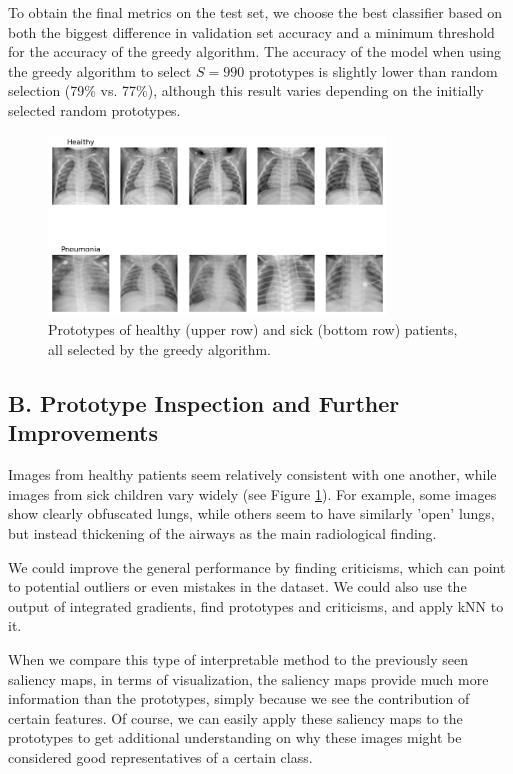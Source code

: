To obtain the final metrics on the test set, we choose the best classifier based on both the biggest difference in validation set accuracy and a minimum threshold for the accuracy of the greedy algorithm.
The accuracy of the model when using the greedy algorithm to select $S=990$ prototypes is slightly lower than random selection (79\% vs. 77\%), although this result varies depending on the initially selected random prototypes.

\begin{figure}
    \centering
    \includegraphics[width=0.8\textwidth]{images/prototypes.png}
    \caption{Prototypes of healthy (upper row) and sick (bottom row) patients, all selected by the greedy algorithm.}
    \label{fig:prototypes}
\end{figure}

\subsection*{B. Prototype Inspection and Further Improvements}

Images from healthy patients seem relatively consistent with one another, while images from sick children vary widely (see Figure \ref{fig:prototypes}). For example, some images show clearly obfuscated lungs, while others seem to have similarly 'open' lungs, but instead thickening of the airways as the main radiological finding.

We could improve the general performance by finding criticisms, which can point to potential outliers or even mistakes in the dataset.
We could also use the output of integrated gradients, find prototypes and criticisms, and apply kNN to it.

When we compare this type of interpretable method to the previously seen saliency maps, in terms of visualization, the saliency maps provide much more information than the prototypes, simply because we see the contribution of certain features.
Of course, we can easily apply these saliency maps to the prototypes to get additional understanding on why these images might be considered good representatives of a certain class.